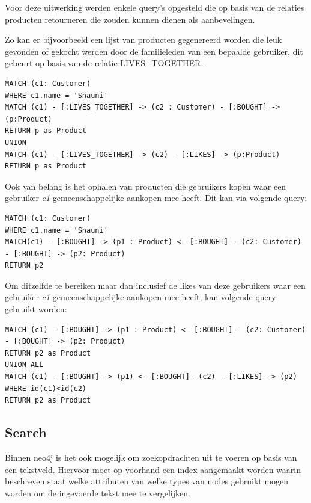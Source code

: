Voor deze uitwerking werden enkele query's opgesteld die op basis van de relaties producten retourneren die zouden kunnen dienen als aanbevelingen.

Zo kan er bijvoorbeeld een lijst van producten gegenereerd worden die leuk gevonden of gekocht werden door de familieleden van een bepaalde gebruiker, dit gebeurt op basis van de relatie LIVES\_TOGETHER.

\begin{lstlisting}[caption={Neo4j query die alle likes en aankopen van de familie van een bepaalde gebruiker c1 weergeeft}]
MATCH (c1: Customer)
WHERE c1.name = 'Shauni'
MATCH (c1) - [:LIVES_TOGETHER] -> (c2 : Customer) - [:BOUGHT] -> (p:Product)
RETURN p as Product
UNION
MATCH (c1) - [:LIVES_TOGETHER] -> (c2) - [:LIKES] -> (p:Product)
RETURN p as Product
\end{lstlisting}

Ook van belang is het ophalen van producten die gebruikers kopen waar een gebruiker \textit{c1} gemeenschappelijke aankopen mee heeft. Dit kan via volgende query:

\begin{lstlisting}[caption={Neo4j query die de aankopen van gebruikers weergeeft waar een gebruiker c1 gemeenschappelijke aankopen mee heeft}]
MATCH (c1: Customer)
WHERE c1.name = 'Shauni'
MATCH(c1) - [:BOUGHT] -> (p1 : Product) <- [:BOUGHT] - (c2: Customer) - [:BOUGHT] -> (p2: Product)
RETURN p2
\end{lstlisting}

Om ditzelfde te bereiken maar dan inclusief de likes van deze gebruikers waar een gebruiker \textit{c1} gemeenschappelijke aankopen mee heeft, kan volgende query gebruikt worden: 

\begin{lstlisting}[caption={Neo4j query die de aankopen en likes van gebruikers weergeeft waar een gebruiker c1 gemeenschappelijke aankopen mee heeft}]
MATCH (c1) - [:BOUGHT] -> (p1 : Product) <- [:BOUGHT] - (c2: Customer) - [:BOUGHT] -> (p2: Product)
RETURN p2 as Product
UNION ALL
MATCH (c1) - [:BOUGHT] -> (p1) <- [:BOUGHT] -(c2) - [:LIKES] -> (p2) 
WHERE id(c1)<id(c2)
RETURN p2 as Product
\end{lstlisting}


\subsection{Search}
\label{subsec: Search Neo4j}

Binnen neo4j is het ook mogelijk om zoekopdrachten uit te voeren op basis van een tekstveld. Hiervoor moet op voorhand een index aangemaakt worden waarin beschreven staat welke attributen van welke types van nodes gebruikt mogen worden om de ingevoerde tekst mee te vergelijken.

